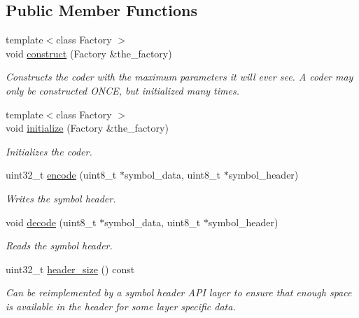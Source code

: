 \subsection*{Public Member Functions}
\begin{DoxyCompactItemize}
\item 
{\footnotesize template$<$class Factory $>$ }\\void \hyperlink{group__factory__api_ga770d14a82969fcb6c9b0ecbf0525a0ca}{construct} (Factory \&the\-\_\-factory)
\begin{DoxyCompactList}\small\item\em Constructs the coder with the maximum parameters it will ever see. A coder may only be constructed O\-N\-C\-E, but initialized many times. \end{DoxyCompactList}\item 
{\footnotesize template$<$class Factory $>$ }\\void \hyperlink{group__factory__api_ga04e884873c981167ed98dd8a3d28f426}{initialize} (Factory \&the\-\_\-factory)
\begin{DoxyCompactList}\small\item\em Initializes the coder. \end{DoxyCompactList}\item 
uint32\-\_\-t \hyperlink{group__codec__header__api_ga3ea9da4a5ac2dcdc55fc29b5ebdfbd84}{encode} (uint8\-\_\-t $\ast$symbol\-\_\-data, uint8\-\_\-t $\ast$symbol\-\_\-header)
\begin{DoxyCompactList}\small\item\em Writes the symbol header. \end{DoxyCompactList}\item 
void \hyperlink{group__codec__header__api_gab3d95c09e12d501a3f94216643144c74}{decode} (uint8\-\_\-t $\ast$symbol\-\_\-data, uint8\-\_\-t $\ast$symbol\-\_\-header)
\begin{DoxyCompactList}\small\item\em Reads the symbol header. \end{DoxyCompactList}\item 
uint32\-\_\-t \hyperlink{group__codec__header__api_gaee83194d70603b13eeaa786ca6e9cdeb}{header\-\_\-size} () const 
\begin{DoxyCompactList}\small\item\em Can be reimplemented by a symbol header A\-P\-I layer to ensure that enough space is available in the header for some layer specific data. \end{DoxyCompactList}\item 

\end{DoxyCompactItemize}
